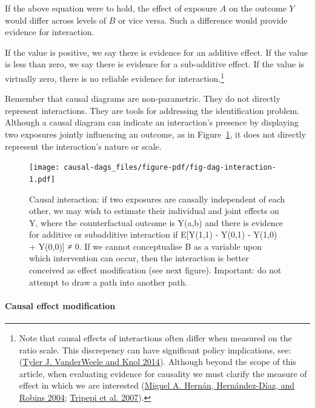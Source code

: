\documentclass[
  singlecolumn]{article}
\let\oldparagraph\paragraph
\renewcommand{\paragraph}[1]{\oldparagraph{#1}\mbox{}}
\begin{document}
If the above equation were to hold, the effect of exposure \(A\) on the
outcome \(Y\) would differ across levels of \(B\) or vice versa. Such a
difference would provide evidence for interaction.

If the value is positive, we say there is evidence for an additive
effect. If the value is less than zero, we say there is evidence for a
sub-additive effect. If the value is virtually zero, there is no
reliable evidence for interaction.\footnote{Note that causal effects of
  interactions often differ when measured on the ratio scale. This
  discrepency can have significant policy implications, see:
  (\protect\hyperlink{ref-vanderweele2014}{Tyler J. VanderWeele and Knol
  2014}). Although beyond the scope of this article, when evaluating
  evidence for causality we must clarify the measure of effect in which
  we are interested (\protect\hyperlink{ref-hernuxe1n2004}{Miguel A.
  Hernán, Hernández-Díaz, and Robins 2004};
  \protect\hyperlink{ref-tripepi2007}{Tripepi et al. 2007}).}

Remember that causal diagrams are non-parametric. They do not directly
represent interactions. They are tools for addressing the identification
problem. Although a causal diagram can indicate an interaction's
presence by displaying two exposures jointly influencing an outcome, as
in Figure~\ref{fig-dag-interaction}, it does not directly represent the
interaction's nature or scale.

\begin{figure}

{\centering \texttt{[image: causal-dags\_files/figure-pdf/fig-dag-interaction-1.pdf]}

}

\caption{\label{fig-dag-interaction}Causal interaction: if two exposures
are causally independent of each other, we may wish to estimate their
individual and joint effects on Y, where the counterfactual outcome is
Y(a,b) and there is evidence for additive or subadditive interaction if
E{[}Y(1,1) - Y(0,1) - Y(1,0) + Y(0,0){]} ≠ 0. If we cannot conceptualise
B as a variable upon which intervention can occur, then the interaction
is better conceived as effect modification (see next figure). Important:
do not attempt to draw a path into another path.}

\end{figure}

\hypertarget{causal-effect-modification}{%
\paragraph{\texorpdfstring{\textbf{Causal effect
modification}}{Causal effect modification}}\label{causal-effect-modification}}
\end{document}

